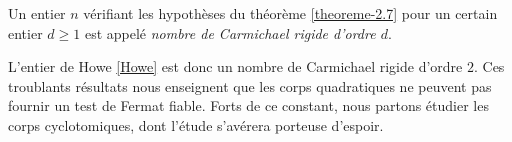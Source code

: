 \begin{definition}
	Un entier $n$ vérifiant les hypothèses du théorème \ref{theoreme-2.7} pour un certain entier $d\geq 1$ est appelé \emph{nombre de Carmichael rigide d'ordre $d$}.
\end{definition}

L'entier de Howe \ref{Howe} est donc un nombre de Carmichael rigide d'ordre $2$. Ces troublants résultats nous enseignent que les corps quadratiques ne peuvent pas fournir un test de Fermat fiable. Forts de ce constant, nous partons étudier les corps cyclotomiques, dont l'étude s'avérera porteuse d'espoir.

